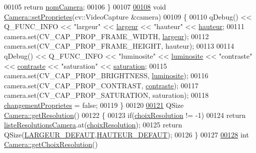\begin{DoxyCode}
00105     \textcolor{keywordflow}{return} \hyperlink{class_camera_ac1cdaf82921d2a2f3f941d867718eba2}{nomCamera};
00106 \}
00107 
\hyperlink{class_camera_a77397d68d606172ccfafed5624c31213}{00108} \textcolor{keywordtype}{void} \hyperlink{class_camera_a77397d68d606172ccfafed5624c31213}{Camera::setProprietes}(cv::VideoCapture &camera)
00109 \{
00110     qDebug() << Q\_FUNC\_INFO << \textcolor{stringliteral}{"largeur"} << \hyperlink{class_camera_ad64f26cdfc5aa561208b273d430938cf}{largeur} << \textcolor{stringliteral}{"hauteur"} << 
      \hyperlink{class_camera_a5d89d7f9d1a5eab4175dd168c7fbf1c7}{hauteur};
00111     camera.set(CV\_CAP\_PROP\_FRAME\_WIDTH, \hyperlink{class_camera_ad64f26cdfc5aa561208b273d430938cf}{largeur});
00112     camera.set(CV\_CAP\_PROP\_FRAME\_HEIGHT, hauteur);
00113 
00114     qDebug() << Q\_FUNC\_INFO << \textcolor{stringliteral}{"luminosite"} << \hyperlink{class_camera_aca5433bf19773161142d73009469b1ed}{luminosite} << \textcolor{stringliteral}{"contraste"} << 
      \hyperlink{class_camera_ad3b300e52c91341d985d3b54f562a0f7}{contraste} << \textcolor{stringliteral}{"saturation"} << \hyperlink{class_camera_afd46d6d2451ee33b68dbc74713f2687c}{saturation};
00115     camera.set(CV\_CAP\_PROP\_BRIGHTNESS, \hyperlink{class_camera_aca5433bf19773161142d73009469b1ed}{luminosite});
00116     camera.set(CV\_CAP\_PROP\_CONTRAST, \hyperlink{class_camera_ad3b300e52c91341d985d3b54f562a0f7}{contraste});
00117     camera.set(CV\_CAP\_PROP\_SATURATION, saturation);
00118     \hyperlink{class_camera_a50d2b3ef5c08f8b61bbe2115d71005bd}{changementProprietes} = \textcolor{keyword}{false};
00119 \}
00120 
\hyperlink{class_camera_a9fae9d9b6fa352ff96c9874d9b085454}{00121} QSize \hyperlink{class_camera_a9fae9d9b6fa352ff96c9874d9b085454}{Camera::getResolution}()
00122 \{
00123     \textcolor{keywordflow}{if}(\hyperlink{class_camera_a3fdddf6f548f04d7bdc26f32602a03d4}{choixResolution} != -1)
00124         \textcolor{keywordflow}{return} \hyperlink{class_camera_a96af62eaf7828664865b56e7c69e771c}{listeResolutionsCamera}.at(\hyperlink{class_camera_a3fdddf6f548f04d7bdc26f32602a03d4}{choixResolution});
00125     \textcolor{keywordflow}{return} QSize(\hyperlink{camera_8h_afe66edd1ec0aa05058aaa2a069248f65}{LARGEUR\_DEFAUT},\hyperlink{camera_8h_a70cf269dc21e5a921c2927034d6cadd2}{HAUTEUR\_DEFAUT});
00126 \}
00127 
\hyperlink{class_camera_ab9f05b05c29416dce6471b5a03db98ea}{00128} \textcolor{keywordtype}{int} \hyperlink{class_camera_ab9f05b05c29416dce6471b5a03db98ea}{Camera::getChoixResolution}()

\end{DoxyCode}
